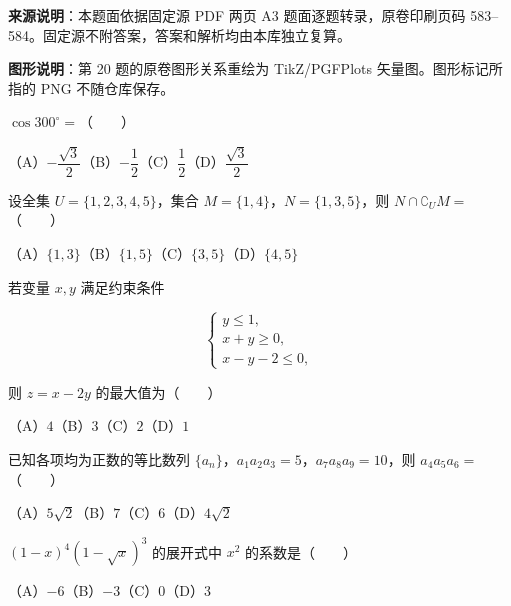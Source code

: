 


\begin{gktip}
\textbf{来源说明}：本题面依据固定源 PDF 两页 A3 题面逐题转录，原卷印刷页码 583–584。固定源不附答案，答案和解析均由本库独立复算。

\textbf{图形说明}：第 20 题的原卷图形关系重绘为 TikZ/PGFPlots 矢量图。图形标记所指的 PNG 不随仓库保存。
\end{gktip}


\begin{question}
$\cos300^\circ=$\mbox{（　　）}

（A）$-\dfrac{\sqrt3}{2}$\quad（B）$-\dfrac12$\quad（C）$\dfrac12$\quad（D）$\dfrac{\sqrt3}{2}$

\end{question}
\begin{question}
设全集 $U=\{1,2,3,4,5\}$，集合 $M=\{1,4\}$，$N=\{1,3,5\}$，则 $N\cap\complement_U M=$\mbox{（　　）}

（A）$\{1,3\}$\quad（B）$\{1,5\}$\quad（C）$\{3,5\}$\quad（D）$\{4,5\}$

\end{question}
\begin{question}
若变量 $x,y$ 满足约束条件

\nopagebreak[4]
\[
\begin{cases}
y\leq 1,\\
x+y\geq0,\\
x-y-2\leq0,
\end{cases}
\]

则 $z=x-2y$ 的最大值为\mbox{（　　）}

（A）$4$\quad（B）$3$\quad（C）$2$\quad（D）$1$

\end{question}
\begin{question}
已知各项均为正数的等比数列 $\{a_n\}$，$a_1a_2a_3=5$，$a_7a_8a_9=10$，则 $a_4a_5a_6=$\mbox{（　　）}

（A）$5\sqrt2$\quad（B）$7$\quad（C）$6$\quad（D）$4\sqrt2$

\end{question}
\begin{question}
$(1-x)^4(1-\sqrt{x})^3$ 的展开式中 $x^2$ 的系数是\mbox{（　　）}

（A）$-6$\quad（B）$-3$\quad（C）$0$\quad（D）$3$

\end{question}
